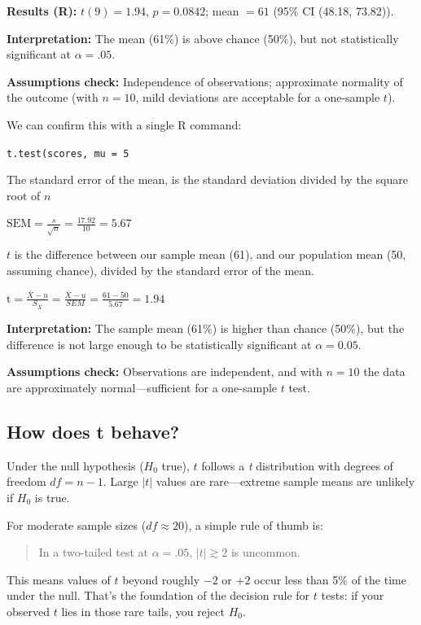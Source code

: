\documentclass[
  letterpaper,
  DIV=11,
  numbers=noendperiod]{scrreprt}
\begin{document}
\textbf{Results (R):} \(t(9)=1.94\), \(p=0.0842\); mean \(=61\) (95\% CI
(48.18, 73.82)).

\textbf{Interpretation:} The mean (61\%) is above chance (50\%), but not
statistically significant at \(\alpha=.05\).

\textbf{Assumptions check:} Independence of observations; approximate
normality of the outcome (with \(n=10\), mild deviations are acceptable
for a one-sample \(t\)).

We can confirm this with a single R command:

\texttt{t.test(scores,\ mu\ =\ 5}

The standard error of the mean, is the standard deviation divided by the
square root of \(n\)

\(\text{SEM} = \frac{s}{\sqrt{n}} = \frac{17.92}{10} = 5.67\)

\(t\) is the difference between our sample mean (61), and our population
mean (50, assuming chance), divided by the standard error of the mean.

\(\text{t} = \frac{\bar{X}-u}{S_{\bar{X}}} = \frac{\bar{X}-u}{SEM} = \frac{61-50}{5.67} = 1.94\)

\textbf{Interpretation:} The sample mean (61\%) is higher than chance
(50\%), but the difference is not large enough to be statistically
significant at \(\alpha = 0.05\).

\textbf{Assumptions check:} Observations are independent, and with
\(n=10\) the data are approximately normal---sufficient for a one-sample
\(t\) test.

\subsection{How does t behave?}\label{how-does-t-behave}

Under the null hypothesis (\(H_0\) true), \(t\) follows a \emph{t}
distribution with degrees of freedom \(df = n - 1\). Large \(|t|\)
values are rare---extreme sample means are unlikely if \(H_0\) is true.

For moderate sample sizes (\(df \approx 20\)), a simple rule of thumb
is:

\begin{quote}
In a two-tailed test at \(\alpha = .05\), \(|t| \gtrsim 2\) is uncommon.
\end{quote}

This means values of \(t\) beyond roughly \(-2\) or \(+2\) occur less
than 5\% of the time under the null. That's the foundation of the
decision rule for \(t\) tests: if your observed \(t\) lies in those rare
tails, you reject \(H_0\).
\end{document}
